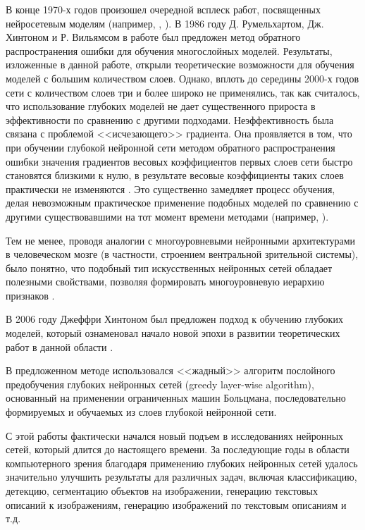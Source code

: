 В конце 1970-х годов произошел очередной всплеск работ, посвященных нейросетевым моделям (например, \cite{Grossberg1976}, \cite{Kohonen1977}).
В 1986 году Д. Румельхартом, Дж. Хинтоном и Р. Вильямсом в работе \cite{rumelhart1986learning} был предложен метод обратного распространения ошибки для обучения многослойных моделей. Результаты, изложенные в данной работе, открыли теоретические возможности для обучения моделей с большим количеством слоев.  Однако, вплоть до середины 2000-х годов сети с количеством слоев три и более широко не применялись, так как считалось, что использование глубоких моделей не дает существенного прироста в эффективности по сравнению с другими подходами. Неэффективность была связана с проблемой <<исчезающего>> градиента. Она проявляется в том, что при обучении глубокой нейронной сети методом обратного распространения ошибки значения градиентов весовых коэффициентов первых слоев сети быстро становятся близкими к нулю, в результате весовые коэффициенты таких слоев практически не изменяются \cite{n5}. Это существенно замедляет процесс обучения, делая невозможным практическое применение подобных моделей по сравнению с другими существовавшими на тот момент времени методами (например, \cite{Corinna1995}).

Тем не менее, проводя аналогии с многоуровневыми нейронными архитектурами в человеческом мозге (в частности, строением вентральной зрительной системы), было понятно, что подобный тип искусственных нейронных сетей обладает полезными свойствами, позволяя формировать многоуровневую иерархию признаков \cite{Behnke2003}.

В 2006 году Джеффри Хинтоном был предложен подход к обучению глубоких моделей, который ознаменовал начало новой эпохи в развитии теоретических работ в данной области \cite{n1}.

В предложенном методе использовался <<жадный>> алгоритм послойного предобучения глубоких нейронных сетей (greedy layer-wise algorithm), основанный на применении ограниченных машин Больцмана, последовательно формируемых и обучаемых из слоев глубокой нейронной сети. 

С этой работы фактически начался новый подъем в исследованиях нейронных сетей, который длится до настоящего времени. За последующие годы в области компьютерного зрения благодаря применению глубоких нейронных сетей удалось значительно улучшить результаты для различных задач, включая классификацию, детекцию, сегментацию объектов на изображении, генерацию текстовых описаний к изображениям, генерацию изображений по текстовым описаниям и т.д.  %

